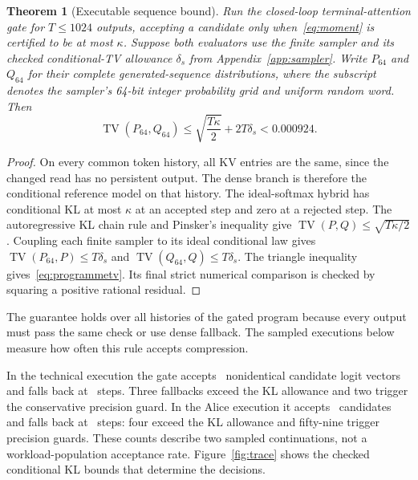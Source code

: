 \documentclass[10pt]{article}
\newtheorem{theorem}{Theorem}
\theoremstyle{definition}\newtheorem{definition}[theorem]{Definition}
\newcommand{\TV}{\operatorname{TV}}
\begin{document}
\begin{samepage}
\begin{theorem}[Executable sequence bound]\label{thm:sequence}
Run the closed-loop terminal-attention gate for $T\leq1024$ outputs, accepting a candidate only when~\eqref{eq:moment} is certified to be at most $\kappa$. Suppose both evaluators use the finite sampler and its checked conditional-TV allowance $\delta_s$ from Appendix~\ref{app:sampler}. Write $P_{64}$ and $Q_{64}$ for their complete generated-sequence distributions, where the subscript denotes the sampler's 64-bit integer probability grid and uniform random word. Then
\begin{equation}\label{eq:programmetv}
 \TV(P_{64},Q_{64})
 \leq\sqrt{\frac{T\kappa}{2}}+2T\delta_s
 <0.000924.
\end{equation}
\end{theorem}
\begin{proof}
On every common token history, all KV entries are the same, since the changed read has no persistent output. The dense branch is therefore the conditional reference model on that history. The ideal-softmax hybrid has conditional KL at most $\kappa$ at an accepted step and zero at a rejected step. The autoregressive KL chain rule and Pinsker's inequality give $\TV(P,Q)\leq\sqrt{T\kappa/2}$. Coupling each finite sampler to its ideal conditional law gives $\TV(P_{64},P)\leq T\delta_s$ and $\TV(Q_{64},Q)\leq T\delta_s$. The triangle inequality gives~\eqref{eq:programmetv}. Its final strict numerical comparison is checked by squaring a positive rational residual.
\end{proof}
\end{samepage}

The guarantee holds over all histories of the gated program because every output must pass the same check or use dense fallback. The sampled executions below measure how often this rule accepts compression.

In the technical execution the gate accepts \TechAccept\ nonidentical candidate logit vectors and falls back at \TechFallback\ steps. Three fallbacks exceed the KL allowance and two trigger the conservative precision guard. In the Alice execution it accepts \LitAccept\ candidates and falls back at \LitFallback\ steps: four exceed the KL allowance and fifty-nine trigger precision guards. These counts describe two sampled continuations, not a workload-population acceptance rate. Figure~\ref{fig:trace} shows the checked conditional KL bounds that determine the decisions.
\end{document}

